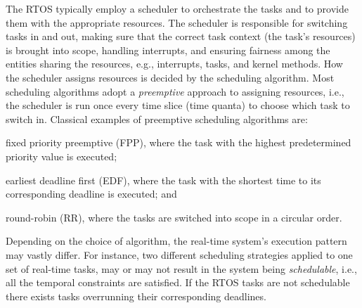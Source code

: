 The RTOS typically employ a scheduler to orchestrate the tasks and to provide them with the appropriate resources.
The scheduler is responsible for switching tasks in and out, making sure that the correct task context (the task's resources) is brought into scope, handling interrupts, and ensuring fairness among the entities sharing the resources, e.g., interrupts, tasks, and kernel methods.
How the scheduler assigns resources is decided by the scheduling algorithm.
Most scheduling algorithms adopt a \emph{preemptive} approach to assigning resources, i.e., the scheduler is run once every time slice (time quanta) to choose which task to switch in.
Classical examples of preemptive scheduling algorithms are:
%
\begin{enumerate*}[label=(\roman*)]
    \item fixed priority preemptive (FPP), where the task with the highest predetermined priority value is executed;
    \item earliest deadline first (EDF), where the task with the shortest time to its corresponding deadline is executed; and
    \item round-robin (RR), where the tasks are switched into scope in a circular order.
\end{enumerate*}
%
Depending on the choice of algorithm, the real-time system's execution pattern may vastly differ.
For instance, two different scheduling strategies applied to one set of real-time tasks, may or may not result in the system being \emph{schedulable}, i.e., all the temporal constraints are satisfied.
If the RTOS tasks are not schedulable there exists tasks overrunning their corresponding deadlines.

